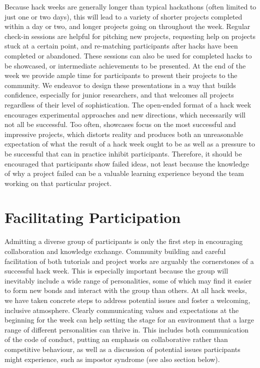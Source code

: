 \documentclass{nature}
\begin{document}
Because hack weeks are generally longer than typical hackathons (often limited to just one or two days), this will lead to a variety of shorter projects completed within a day or two, and longer projects going on throughout the week. Regular check-in sessions are helpful for pitching new projects, requesting help on projects stuck at a certain point, and re-matching participants after hacks have been completed or abandoned. These sessions can also be used for completed hacks to be showcased, or intermediate achievements to be presented. At the end of the week we provide ample time for participants to present their projects to the community. We endeavor to design these presentations in a way that builds confidence, especially for junior researchers, and that welcomes all projects regardless of their level of sophistication. The open-ended format of a hack week encourages experimental approaches and new directions, which necessarily will not all be successful. Too often, showcases focus on the most successful and impressive projects, which distorts reality and produces both an unreasonable expectation of what the result of a hack week ought to be as well as a pressure to be successful that can in practice inhibit participants. Therefore, it should be encouraged that participants show failed ideas, not least because the knowledge of why a project failed can be a valuable learning experience beyond the team working on that particular project.

\section{Facilitating Participation}

Admitting a diverse group of participants is only the first step in encouraging collaboration and knowledge exchange. Community building and careful facilitation of both tutorials and project works are arguably the cornerstones of a successful hack week. This is especially important because the group will inevitably include a wide range of personalities, some of which may find it easier to form new bonds and interact with the group than others. At all hack weeks, we have taken concrete steps to address potential issues and foster a welcoming, inclusive atmosphere. Clearly communicating values and expectations at the beginning for the week can help setting the stage for an environment that a large range of different personalities can thrive in. This includes both communication of the code of conduct, putting an emphasis on collaborative rather than competitive behaviour, as well as a discussion of potential issues participants might experience, such as impostor syndrome (see also section below).
\end{document}
